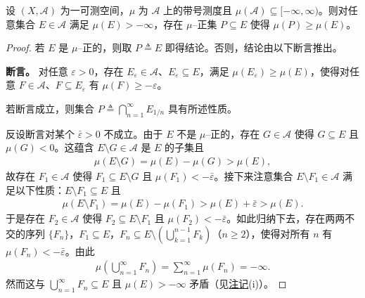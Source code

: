 \documentclass[../../main.tex]{subfiles}%
\begin{document}
\begin{lemma}\label{lemma:ch01-正集子集}
设 $(X,\mathcal{A})$ 为一可测空间，$\mu$ 为 $\mathcal{A}$ 上的带号测度且 $\mu(\mathcal{A})\subseteq[-\infty,\infty)$。则对任意集合 $E\in\mathcal{A}$ 满足 $\mu(E)>-\infty$，存在 $\mu$--正集 $P\subseteq E$ 使得 $\mu(P)\geqslant\mu(E)$。
\end{lemma}

\begin{proof}
若 $E$ 是 $\mu$--正的，则取 $P\triangleq E$ 即得结论。否则，结论由以下断言推出。

\textbf{断言。} 对任意 $\varepsilon>0$，存在 $E_\varepsilon\in\mathcal{A}$、$E_\varepsilon\subseteq E$，满足 $\mu(E_\varepsilon)\geqslant\mu(E)$，使得对任意 $F\in\mathcal{A}$、$F\subseteq E_\varepsilon$ 有 $\mu(F)\geqslant-\varepsilon$。

若断言成立，则集合 $P\triangleq\bigcap_{n=1}^\infty E_{1/n}$ 具有所述性质。

反设断言对某个 $\bar{\varepsilon}>0$ 不成立。由于 $E$ 不是 $\mu$--正的，存在 $G\in\mathcal{A}$ 使得 $G\subseteq E$ 且 $\mu(G)<0$。这蕴含 $E\setminus G\in\mathcal{A}$ 是 $E$ 的子集且
\begin{align*}
\mu(E\setminus G)=\mu(E)-\mu(G)>\mu(E),
\end{align*}
故存在 $F_1\in\mathcal{A}$ 使得 $F_1\subseteq E\setminus G$ 且 $\mu(F_1)<-\bar{\varepsilon}$。接下来注意集合 $E\setminus F_1\in\mathcal{A}$ 满足以下性质：$E\setminus F_1\subseteq E$ 且
\begin{align*}
\mu(E\setminus F_1)=\mu(E)-\mu(F_1)>\mu(E)+\bar{\varepsilon}>\mu(E).
\end{align*}
于是存在 $F_2\in\mathcal{A}$ 使得 $F_2\subseteq E\setminus F_1$ 且 $\mu(F_2)<-\bar{\varepsilon}$。如此归纳下去，存在两两不交的序列 $\{F_n\}$，$F_1\subseteq E$，$F_n\subseteq E\setminus\left(\bigcup_{k=1}^{n-1}F_k\right)$（$n\geqslant2$），使得对所有 $n$ 有 $\mu(F_n)<-\bar{\varepsilon}$。由此
\begin{align*}
\mu\left(\bigcup_{n=1}^\infty F_n\right)=\sum_{n=1}^\infty\mu(F_n)=-\infty.
\end{align*}
然而这与 $\bigcup_{n=1}^\infty F_n\subseteq E$ 且 $\mu(E)>-\infty$ 矛盾（见\hyperref[remark:ch01-带号测度性质]{注记}(i)）。
\end{proof}
\end{document}
